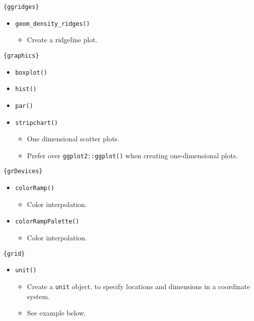 \documentclass[
]{book}
\providecommand{\tightlist}{%
  \setlength{\itemsep}{0pt}\setlength{\parskip}{0pt}}
\begin{document}
\texttt{\{ggridges\}}

\begin{itemize}
\tightlist
\item
  \texttt{geom\_density\_ridges()}

  \begin{itemize}
  \tightlist
  \item
    Create a ridgeline plot.
  \end{itemize}
\end{itemize}

\texttt{\{graphics\}}

\begin{itemize}
\tightlist
\item
  \texttt{boxplot()}
\item
  \texttt{hist()}
\item
  \texttt{par()}
\item
  \texttt{stripchart()}

  \begin{itemize}
  \tightlist
  \item
    One dimensional scatter plots.
  \item
    Prefer over \texttt{ggplot2::ggplot()} when creating one-dimensional plots.
  \end{itemize}
\end{itemize}

\texttt{\{grDevices\}}

\begin{itemize}
\tightlist
\item
  \texttt{colorRamp()}

  \begin{itemize}
  \tightlist
  \item
    Color interpolation.
  \end{itemize}
\item
  \texttt{colorRampPalette()}

  \begin{itemize}
  \tightlist
  \item
    Color interpolation.
  \end{itemize}
\end{itemize}

\texttt{\{grid\}}

\begin{itemize}
\tightlist
\item
  \texttt{unit()}

  \begin{itemize}
  \tightlist
  \item
    Create a \texttt{unit} object, to specify locations and dimensions in a coordinate system.
  \item
    See example below.
  \end{itemize}
\end{itemize}
\end{document}

